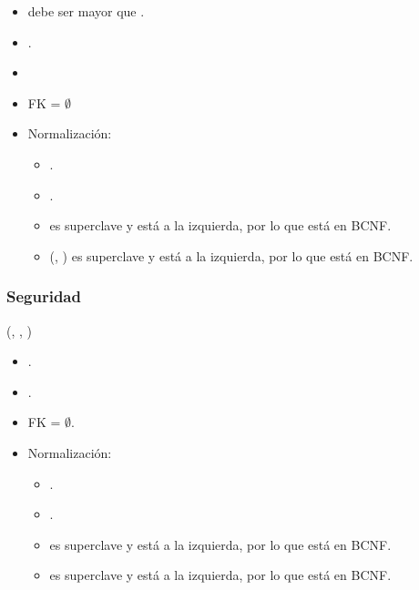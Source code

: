     \begin{itemize}
        \item {} debe ser mayor que .
        \item {}.
        \item {}
        \item FK = $\emptyset$

        \item Normalización:
            
            \begin{itemize}
                \item {}.
                \item {}.
                    
                \item {} es superclave y está a la izquierda, por lo
                    que está en BCNF.

                \item (, ) es superclave y
                    está a la izquierda, por lo
                    que está en BCNF.
            \end{itemize}
    \end{itemize}

\subsubsection{Seguridad}

    (, , )

    \begin{itemize}
        \item {}.
        \item {}.
        \item FK = $\emptyset$.

        \item Normalización:
            \begin{itemize}
                \item {}.
                \item {}.
                \item {} es superclave y está a la izquierda, por lo
                    que está en BCNF.
                \item {} es superclave y está a la izquierda, por lo
                    que está en BCNF.
            \end{itemize}
    \end{itemize}

